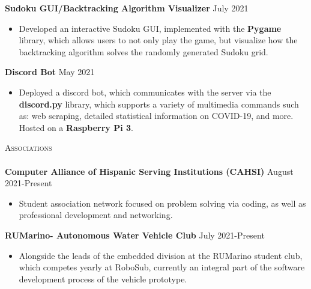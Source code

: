 \documentclass[a4paper]{article}
\newcommand{\lineunder} {
    \vspace*{-8pt} \\
    \hspace*{-18pt} \hrulefill \\
}
\newcommand{\header} [1] {
    {\hspace*{-18pt}\vspace*{6pt} \textsc{#1}}
    \vspace*{-6pt} \lineunder
}
\begin{document}
{\textbf{Sudoku GUI/Backtracking Algorithm Visualizer}} \hfill July 2021  \\
\vspace{-1.5mm}

\begin{itemize} \itemsep -1pt
\item Developed an interactive Sudoku GUI, implemented with the \textbf{Pygame} library, which allows users to not only play the game, but visualize how the backtracking algorithm solves the randomly generated Sudoku grid.
\end{itemize}

\vspace*{-1mm}
{\textbf{Discord Bot}} \hfill May 2021 \\
\vspace{-2.5mm}

\begin{itemize} \itemsep -1pt
\item Deployed a discord bot, which communicates with the server via the \textbf{discord.py} library, which supports a variety of multimedia commands such as: web scraping, detailed statistical information on COVID-19, and more. Hosted on a \textbf{Raspberry Pi 3}.\\
\end{itemize}
\vspace*{1mm}

\header{Associations}

\vspace{-1mm} \textbf{Computer Alliance of Hispanic Serving Institutions (CAHSI)} \hfill August 2021-Present\\
\begin{itemize} \itemsep -1pt
\vspace{-2mm}
\item Student association network focused on problem solving via coding, as well as professional development and networking. \\
\end{itemize}

\vspace{-2mm}
\textbf{RUMarino- Autonomous Water Vehicle Club} \hfill July 2021-Present \\ 
\vspace{-2mm}
\begin{itemize} \itemsep -1pt
\item Alongside the leads of the embedded division at the RUMarino student club, which competes yearly at RoboSub, currently an integral part of the software development process of the vehicle prototype. \\ 
\end{itemize}
 


\ 
\end{document}
